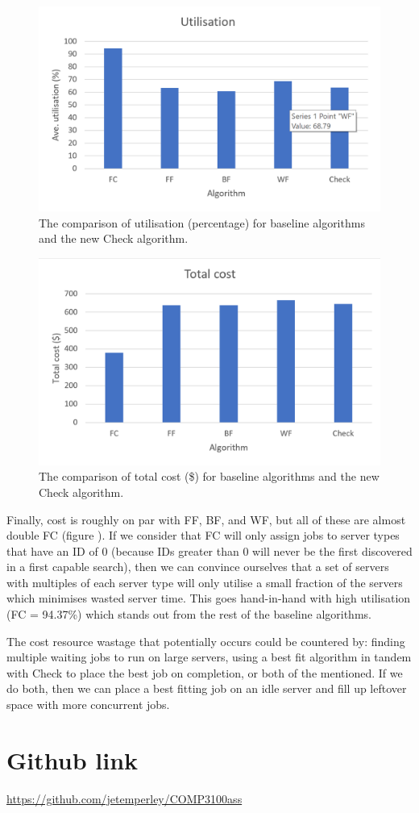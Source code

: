 \documentclass[a4paper]{article} %
\begin{document}
\begin{figure}
    \centering
    \includegraphics{utilGraph.png}
    \caption{The comparison of utilisation (percentage) for baseline algorithms and the new Check algorithm.}
    \label{fig:util}
\end{figure}

\begin{figure}
    \centering
    \includegraphics{costGraph.png}
    \caption{The comparison of total cost (\$) for baseline algorithms and the new Check algorithm.}
    \label{fig:util}
\end{figure}

Finally, cost is roughly on par with FF, BF, and WF, but all of these are almost double FC (figure \label{fig:cost}). If we consider that FC will only assign jobs to server types that have an ID of 0 (because IDs greater than 0 will never be the first discovered in a first capable search), then we can convince ourselves that a set of servers with multiples of each server type will only utilise a small fraction of the servers which minimises wasted server time. This goes hand-in-hand with high utilisation (FC = 94.37\%) which stands out from the rest of the baseline algorithms.\par
The cost resource wastage that potentially occurs could be countered by: finding multiple waiting jobs to run on large servers, using a best fit algorithm in tandem with Check to place the best job on completion, or both of the mentioned. If we do both, then we can place a best fitting job on an idle server and fill up leftover space with more concurrent jobs.




\section{Github link}
\url{https://github.com/jetemperley/COMP3100ass}
\end{document}
